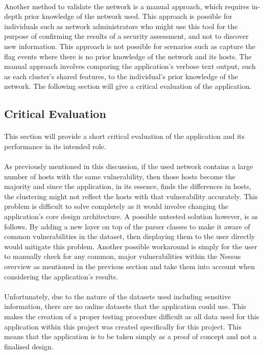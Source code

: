 \paragraph{}Another method to validate the network is a manual approach, which requires in-depth prior knowledge of the network used. This approach is possible for individuals such as network administrators who might use this tool for the purpose of confirming the results of a security assessment, and not to discover new information. This approach is not possible for scenarios such as capture the flag events where there is no prior knowledge of the network and its hosts. The manual approach involves comparing the application's verbose text output, such as each cluster's shared features, to the individual's prior knowledge of the network. The following section will give a critical evaluation of the application.

\subsection{Critical Evaluation}
\label{criteval}
\paragraph{}This section will provide a short critical evaluation of the application and its performance in its intended role.

\paragraph{}As previously mentioned in this discussion, if the used network contains a large number of hosts with the same vulnerability, then those hosts become the majority and since the application, in its essence, finds the differences in hosts, the clustering might not reflect the hosts with that vulnerability accurately. This problem is difficult to solve completely as it would involve changing the application's core design architecture. A possible untested solution however, is as follows. By adding a new layer on top of the parser classes to make it aware of common vulnerabilities in the dataset, then displaying them to the user directly would mitigate this problem. Another possible workaround is simply for the user to manually check for any common, major vulnerabilities within the Nessus overview as mentioned in the previous section and take them into account when considering the application's results.

\paragraph{}Unfortunately, due to the nature of the datasets used including sensitive information, there are no online datasets that the application could use. This makes the creation of a proper testing procedure difficult as all data used for this application within this project was created specifically for this project. This means that the application is to be taken simply as a proof of concept and not a finalised design.

